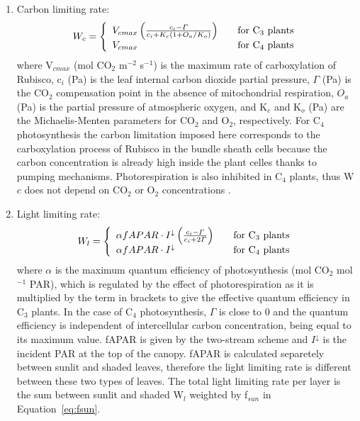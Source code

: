 \begin{enumerate}
 \item Carbon limiting rate:
\begin{equation}\label{eq:wc}
 W_c = \left\{
  \begin{array}{l l}
    V_{cmax}\left(\frac{c_i-\varGamma}{c_i+K_c(1+O_a/K_o)}\right) & 
   \quad \textrm{for C$_3$ plants}\\
    V_{cmax} & 
     \quad \textrm {for C$_4$ plants}
  \end{array}\right.
 \end{equation}
\noindent where V$_{cmax}$ (mol CO$_2$ m$^{-2}$ s$^{-1}$) is the maximum rate of carboxylation of Rubisco, c$_i$ (Pa) is the leaf internal carbon dioxide partial pressure, $\varGamma$ (Pa) is the CO$_2$ compensation point in the absence of mitochondrial respiration, $O_a$ (Pa) is the partial pressure of atmospheric oxygen, and K$_c$ and K$_o$ (Pa) are the Michaelis-Menten parameters for CO$_2$ and O$_2$, respectively. For C$_4$ photosynthesis the carbon limitation imposed here corresponds to the carboxylation process of Rubisco in the bundle sheath cells because the carbon concentration is already high inside the plant celles thanks to pumping mechanisms. Photorespiration is also inhibited in C$_4$ plants, thus W$c$ does not depend on CO$_2$ or O$_2$ concentrations \citep{Collatz1992}.

 \item Light limiting rate:
\begin{equation}\label{eq:wl}
 W_l = \left\{
  \begin{array}{l l}
    \alpha fAPAR \cdot I^{\downarrow} \left(\frac{c_i-\varGamma}{c_i+2\varGamma}\right)  & 
   \quad \textrm{for C$_3$ plants}\\
    \alpha fAPAR \cdot I^{\downarrow} & 
     \quad \textrm {for C$_4$ plants}
  \end{array}\right.
 \end{equation}
\noindent where $\alpha$ is the maximum quantum efficiency of photosynthesis (mol CO$_2$ mol$^{−1}$ PAR), which is regulated by the effect of photorespiration as it is multiplied by the term in brackets to give the effective quantum efficiency in C$_3$ plants. In the case of C$_4$ photosynthesis, $\varGamma$ is close to 0 and the quantum efficiency is independent of intercellular carbon concentration, being equal to its maximum value. fAPAR is given by the two-stream scheme and $I^{\downarrow}$ is the incident PAR at the top of the canopy. fAPAR is calculated separetely between sunlit and shaded leaves, therefore the light limiting rate is different between these two types of leaves. The total light limiting rate per layer is the sum between sunlit and shaded W$_l$ weighted by f$_{sun}$ in Equation~\ref{eq:fsun}.


\end{enumerate}
